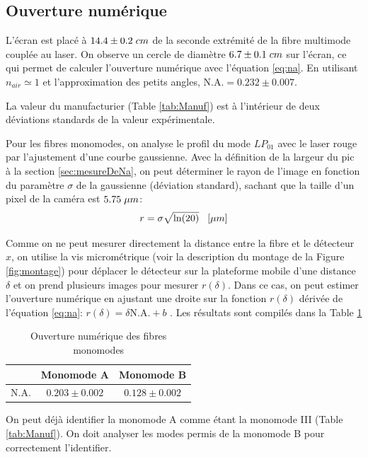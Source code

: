 \documentclass[10pt,letterpaper,twocolumn]{article}
\newcommand{\s}{\hspace{0.1cm}}
\newcommand{\na}{\text{N.A.}}
\begin{document}
\subsection{Ouverture numérique}
L'écran est placé à $14.4 \pm 0.2 \s cm$ de la seconde extrémité de la fibre multimode couplée au laser. On observe un cercle de diamètre $6.7 \pm 0.1\s cm$ sur l'écran, ce qui permet de calculer l'ouverture numérique avec l'équation \eqref{eq:na}. En utilisant $n_{air} \simeq 1$ et l'approximation des petits angles, $\na = 0.232 \pm 0.007$. \par
La valeur du manufacturier (Table \ref{tab:Manuf}) est à l'intérieur de deux déviations standards de la valeur expérimentale. \par
Pour les fibres monomodes, on analyse le profil du mode $LP_{01}$ avec le laser rouge par l'ajustement d'une courbe gaussienne. Avec la définition de la largeur du pic à la section \ref{sec:mesureDeNa}, on peut déterminer le rayon de l'image en fonction du paramètre $\sigma$ de la gaussienne (déviation standard), sachant que la taille d'un pixel de la caméra est $5.75\s \mu m$:
\begin{equation}
	r = \sigma \sqrt{\ln(20)}\s\s\s [\mu m]
\end{equation}\par
Comme on ne peut mesurer directement la distance entre la fibre et le détecteur $x$, on utilise la vis micrométrique (voir la description du montage de la Figure \ref{fig:montage}) pour déplacer le détecteur sur la plateforme mobile d'une distance $\delta$ et on prend plusieurs images pour mesurer $r(\delta)$. Dans ce cas, on peut estimer l'ouverture numérique en ajustant une droite sur la fonction $r(\delta)$ dérivée de l'équation \eqref{eq:na}: $r(\delta) = \delta\na + b$ . Les résultats sont compilés dans la Table \ref{tab:NAMono}  

\begin{table}[H]
	\centering
	\caption{Ouverture numérique des fibres monomodes}
	\label{tab:NAMono}
	\begin{tabular}{|c|c|c|}
	\hline
			& Monomode A & Monomode B \\\hline
	$\na$ 	& $ 0.203 \pm 0.002$ & $ 0.128 \pm  0.002$ \\\hline
	\end{tabular}
\end{table}
On peut déjà identifier la monomode A comme étant la monomode III (Table \ref{tab:Manuf}). On doit analyser les modes permis de la monomode B pour correctement l'identifier.
\end{document}
